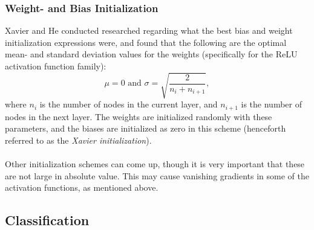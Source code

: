         \subsubsection{Weight- and Bias Initialization}
            Xavier and He \cite{He2015} conducted researched regarding what the best bias and weight initialization expressions were, and found that the following are the optimal mean- and standard deviation values for the weights (specifically for the ReLU activation function family):
            \begin{equation}\label{eq:xavier}
                \mu = 0 \text{ and } \sigma = \sqrt{\frac{2}{n_i+n_{i+1}}},
            \end{equation}
            where $n_i$ is the number of nodes in the current layer, and $n_{i+1}$ is the number of nodes in the next layer. The weights are initialized randomly with these parameters, and the biases are initialized as zero in this scheme (henceforth referred to as the \textit{Xavier initialization}).\\\\
            Other initialization schemes can come up, though it is very important that these are not large in absolute value. This may cause vanishing gradients in some of the activation functions, as mentioned above. 
        
    \subsection{Classification}
        
        
        
    
        
    
        
